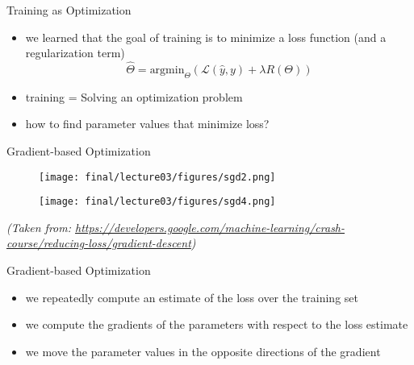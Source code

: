 \begin{frame}{Training as Optimization}
    \begin{itemize}
        \item<1-> we learned that the goal of training is to minimize a loss function (and a regularization term)
        \begin{equation*}
            \hat{\Theta} =\text{argmin}_{\Theta} \left( \mathcal{L}(\hat{y},y)  + \lambda R(\Theta) \right)
        \end{equation*}
        \item<2-> training = Solving an optimization problem
        \item<3-> how to find parameter values that minimize loss?
    \end{itemize}
\end{frame}
\begin{frame}{Gradient-based Optimization}
   
    {
      \begin{figure}
        \centering
        \texttt{[image: final/lecture03/figures/sgd2.png]}
    \end{figure}      
    }
    {
     \begin{figure}
        \centering
        \texttt{[image: final/lecture03/figures/sgd4.png]}
    \end{figure}
    }
\vspace*{\fill}
\textit{\tiny{(Taken from: 
\url{https://developers.google.com/machine-learning/crash-course/reducing-loss/gradient-descent})}}
   
\end{frame}
\begin{frame}{Gradient-based Optimization}
    \begin{itemize}
        \item<1-> we repeatedly compute an estimate of the loss over the training set
        \item<2-> we compute the gradients of the parameters with respect to the loss estimate
        \item<3-> we move the parameter values in the opposite directions of the gradient
    \end{itemize}
\end{frame}
